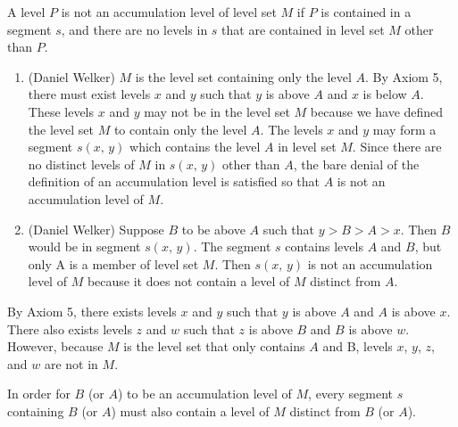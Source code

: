 \problem
{}
A level $P$ is not an accumulation level of level set $M$ if $P$ is contained in a segment $s$, and there are no levels in $s$ that are contained in level set $M$ other than $P$.


\problem
\solutionAlt
\begin{enumerate}
    \item (Daniel Welker) $M$ is the level set containing only the level $A$. By Axiom 5, there must exist levels $x$ and $y$ such that $y$ is above $A$ and $x$ is below $A$. These levels $x$ and $y$ may not be in the level set $M$ because we have defined the level set $M$ to contain only the level $A$. The levels $x$ and $y$ may form a segment $s(x,\,y)$ which contains the level $A$ in level set $M$. Since there are no distinct levels of $M$ in $s(x,\,y)$ other than $A$, the bare denial of the definition of an accumulation level is satisfied so that $A$ is not an accumulation level of $M$.
    \item (Daniel Welker) Suppose $B$ to be above $A$ such that $y > B > A > x$. Then $B$ would be in segment $s(x,\,y)$. The segment $s$ contains levels $A$ and $B$, but only $ $A is a member of level set $M$. Then $s(x,\,y)$ is not an accumulation level of $M$ because it does not contain a level of $M$ distinct from $A$.
\end{enumerate}

\problem
{}
By Axiom 5, there exists levels $x$ and $y$ such that $y$ is above $A$ and $A$ is above $x$. There also exists levels $z$ and $w$ such that $z$ is above $B$ and $B$ is above $w$. However, because $M$ is the level set that only contains $A$ and $ $B, levels $x$, $y$, $z$, and $w$ are not in $M$.

In order for $B$ (or $A$) to be an accumulation level of $M$, every segment $s$ containing $B$ (or $A$) must also contain a level of $M$ distinct from $B$ (or $A$).

